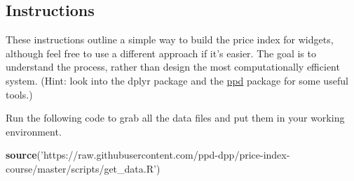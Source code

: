 \documentclass[]{article}
\newenvironment{Shaded}{\begin{snugshade}}{\end{snugshade}}
\newcommand{\KeywordTok}[1]{\textcolor[rgb]{0.13,0.29,0.53}{\textbf{#1}}}
\newcommand{\NormalTok}[1]{#1}
\newcommand{\StringTok}[1]{\textcolor[rgb]{0.31,0.60,0.02}{#1}}
\begin{document}
\hypertarget{instructions}{%
\subsection{Instructions}\label{instructions}}

These instructions outline a simple way to build the price index for widgets, although feel free to use a different approach if it's easier. The goal is to understand the process, rather than design the most computationally efficient system. (Hint: look into the dplyr package and the \href{https://github.com/marberts/ppd}{ppd} package for some useful tools.)

Run the following code to grab all the data files and put them in your working environment.

\begin{Shaded}
\begin{Highlighting}[]
\KeywordTok{source}\NormalTok{(}\StringTok{'https://raw.githubusercontent.com/ppd-dpp/price-index-course/master/scripts/get_data.R'}\NormalTok{)}
\end{Highlighting}
\end{Shaded}
\end{document}
